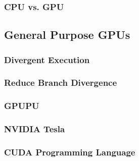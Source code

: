 \subsubsection{CPU vs. GPU}
\subsection{General Purpose GPUs}
\subsubsection{Divergent Execution}
\subsubsection{Reduce Branch Divergence}
\subsubsection{GPUPU}
\subsubsection{NVIDIA Tesla}
\subsubsection{CUDA Programming Language}
